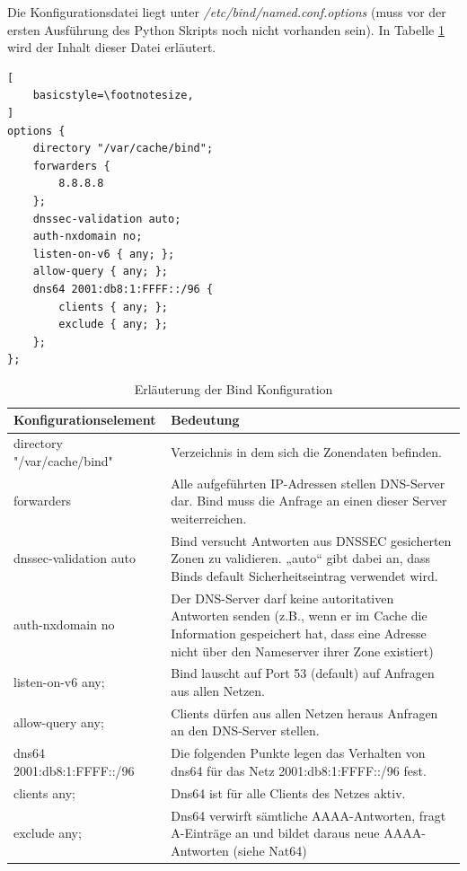 Die Konfigurationsdatei liegt unter \textit{/etc/bind/named.conf.options} (muss vor der ersten Ausführung des Python Skripts noch nicht vorhanden sein). In Tabelle \ref{tab:bindConfig} wird der Inhalt dieser Datei erläutert.
\begin{lstlisting}[
	basicstyle=\footnotesize,
]
options {
	directory "/var/cache/bind";
	forwarders {
		8.8.8.8
	};
	dnssec-validation auto;
	auth-nxdomain no;
	listen-on-v6 { any; };
	allow-query { any; };
	dns64 2001:db8:1:FFFF::/96 {
		clients { any; };
		exclude { any; };
	};
};
\end{lstlisting}

\begin{table}
	\begin{tabular}{lp{9cm}}
		Konfigurationselement & Bedeutung \\ \hline
		directory "/var/cache/bind" & Verzeichnis in dem sich die Zonendaten befinden. \\
		forwarders & Alle aufgeführten IP-Adressen stellen DNS-Server dar. Bind muss die Anfrage an einen dieser Server weiterreichen. \\
		dnssec-validation auto & Bind versucht Antworten aus DNSSEC gesicherten Zonen zu validieren. „auto“ gibt dabei an, dass Binds default Sicherheitseintrag verwendet wird. \\
		auth-nxdomain no & Der DNS-Server darf keine autoritativen Antworten senden (z.B., wenn er im Cache die Information gespeichert hat, dass eine Adresse nicht über den Nameserver ihrer Zone existiert) \\
		listen-on-v6 { any; } & Bind lauscht auf Port 53 (default) auf Anfragen aus allen Netzen. \\
		allow-query { any; } & Clients dürfen aus allen Netzen heraus Anfragen an den DNS-Server stellen. \\
		dns64 2001:db8:1:FFFF::/96 & Die folgenden Punkte legen das Verhalten von dns64 für das Netz 2001:db8:1:FFFF::/96 fest. \\
		clients { any; } & Dns64 ist für alle Clients des Netzes aktiv. \\
		exclude { any; } & Dns64 verwirft sämtliche AAAA-Antworten, fragt A-Einträge an und bildet daraus neue AAAA-Antworten (siehe Nat64) \\
	\end{tabular}
	\caption{Erläuterung der Bind Konfiguration}
	\label{tab:bindConfig}
\end{table}

\FloatBarrier

